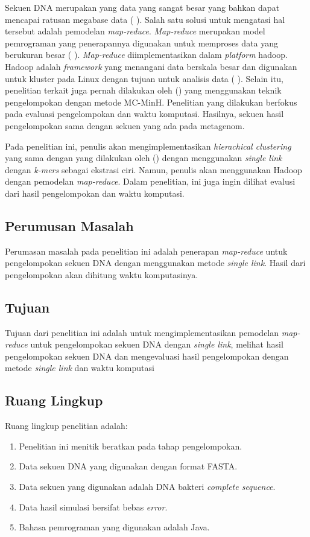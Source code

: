 Sekuen DNA merupakan yang data yang sangat besar yang bahkan dapat mencapai ratusan megabase data (\citeauthor{KUNIN2008} \cite*{KUNIN2008}). Salah satu solusi untuk mengatasi hal tersebut adalah pemodelan \textit{map-reduce}. \textit{Map-reduce} merupakan model pemrograman yang penerapannya digunakan untuk memproses data yang berukuran besar  (\citeauthor{DEAN2004} \cite*{DEAN2004}). \textit{Map-reduce} diimplementasikan dalam \textit{platform} hadoop. Hadoop adalah \textit{framework} yang menangani data berskala besar dan digunakan untuk kluster pada Linux dengan tujuan untuk analisis data (\citeauthor{TAYLOR2010} \cite*{TAYLOR2010}).  Selain itu, penelitian terkait juga pernah dilakukan oleh \citeauthor{RASHEED2013} (\cite*{RASHEED2013}) yang menggunakan teknik pengelompokan dengan metode MC-MinH. Penelitian yang dilakukan berfokus pada evaluasi pengelompokan dan waktu komputasi. Hasilnya, sekuen hasil pengelompokan sama dengan sekuen yang ada pada metagenom.

Pada penelitian ini, penulis akan mengimplementasikan \textit{hierachical clustering} yang sama dengan yang dilakukan oleh \citeauthor{TAMSIN2013} (\cite*{TAMSIN2013}) dengan menggunakan \textit{single link} dengan \textit{k-mers} sebagai ekstrasi ciri. Namun, penulis akan menggunakan Hadoop dengan pemodelan \textit{map-reduce}. Dalam penelitian, ini juga ingin dilihat evalusi dari hasil pengelompokan dan waktu komputasi.

\subsection*{Perumusan Masalah}
Perumasan masalah pada penelitian ini adalah penerapan \textit{map-reduce} untuk pengelompokan sekuen DNA dengan menggunakan metode \textit{single link}. Hasil dari pengelompokan akan dihitung waktu komputasinya.

\subsection*{Tujuan}
Tujuan dari penelitian ini adalah untuk mengimplementasikan pemodelan \textit{map-reduce} untuk pengelompokan sekuen DNA dengan \textit{single link}, melihat hasil pengelompokan sekuen DNA dan mengevaluasi hasil pengelompokan dengan metode \textit{single link} dan waktu komputasi

\subsection*{Ruang Lingkup}
Ruang lingkup penelitian adalah:
\begin{enumerate}[noitemsep] 
\item Penelitian ini menitik beratkan pada tahap pengelompokan.
\item Data sekuen DNA yang digunakan dengan format FASTA.
\item Data sekuen yang digunakan adalah DNA bakteri \textit{complete sequence}.
\item Data hasil simulasi bersifat bebas \textit{error}.
\item Bahasa pemrograman yang digunakan adalah Java.
\end{enumerate}

